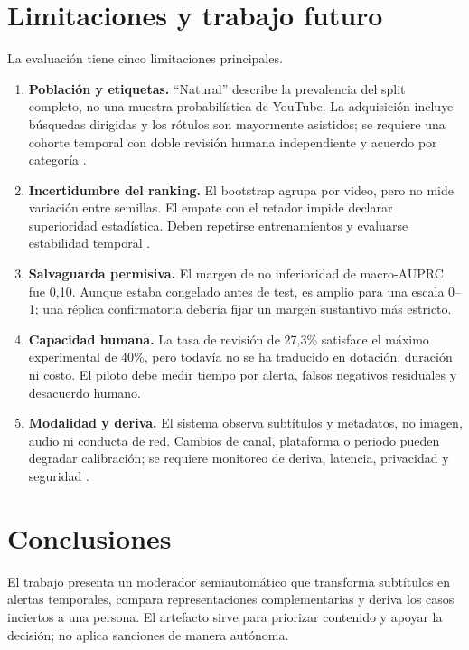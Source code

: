\section{Limitaciones y trabajo futuro}

La evaluación tiene cinco limitaciones principales.

\begin{enumerate}
\item \textbf{Población y etiquetas.} “Natural” describe la prevalencia del split completo, no una muestra probabilística de YouTube. La adquisición incluye búsquedas dirigidas y los rótulos son mayormente asistidos; se requiere una cohorte temporal con doble revisión humana independiente y acuerdo por categoría \cite{artstein2008agreement,moreno2012datasetshift}.
\item \textbf{Incertidumbre del ranking.} El bootstrap agrupa por video, pero no mide variación entre semillas. El empate con el retador impide declarar superioridad estadística. Deben repetirse entrenamientos y evaluarse estabilidad temporal \cite{dror2018significance,cawley2010selection}.
\item \textbf{Salvaguarda permisiva.} El margen de no inferioridad de macro-AUPRC fue 0,10. Aunque estaba congelado antes de test, es amplio para una escala 0--1; una réplica confirmatoria debería fijar un margen sustantivo más estricto.
\item \textbf{Capacidad humana.} La tasa de revisión de 27,3\% satisface el máximo experimental de 40\%, pero todavía no se ha traducido en dotación, duración ni costo. El piloto debe medir tiempo por alerta, falsos negativos residuales y desacuerdo humano.
\item \textbf{Modalidad y deriva.} El sistema observa subtítulos y metadatos, no imagen, audio ni conducta de red. Cambios de canal, plataforma o periodo pueden degradar calibración; se requiere monitoreo de deriva, latencia, privacidad y seguridad \cite{tatman2017captions,aoir2020ethics}.
\end{enumerate}

\section{Conclusiones}

El trabajo presenta un moderador semiautomático que transforma subtítulos en alertas temporales, compara representaciones complementarias y deriva los casos inciertos a una persona. El artefacto sirve para priorizar contenido y apoyar la decisión; no aplica sanciones de manera autónoma.

